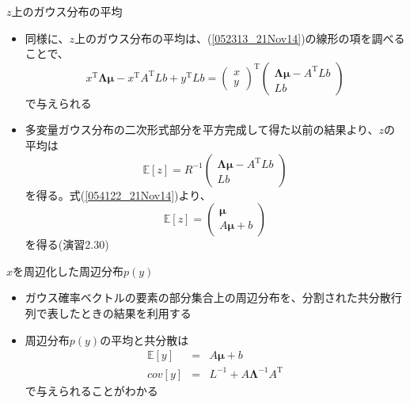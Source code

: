 \begin{frame}{$z$上のガウス分布の平均}
 \begin{itemize}
  \item 同様に、$z$上のガウス分布の平均は、(\ref{052313_21Nov14})の線形の項を調べることで、
        \begin{equation}
         x^{\mathrm{T}}\bm{\Lambda}\bm{\mu}-x^{\mathrm{T}}A^{\mathrm{T}}Lb+y^{\mathrm{T}}Lb =
          \begin{pmatrix}
           x \\
           y
          \end{pmatrix}^{\mathrm{T}}
          \begin{pmatrix}
           \bm{\Lambda}\bm{\mu}-A^{\mathrm{T}}Lb \\
           Lb
          \end{pmatrix}
        \end{equation}
        で与えられる
  \item 多変量ガウス分布の二次形式部分を平方完成して得た以前の結果より、$z$の平均は
        \begin{equation}
         \mathbb{E}[z]=R^{-1}
          \begin{pmatrix}
           \bm{\Lambda}\bm{\mu}-A^{\mathrm{T}}Lb \\
           Lb
          \end{pmatrix}
        \end{equation}
        を得る。式(\ref{054122_21Nov14})より、
        \begin{equation}
         \mathbb{E}[z]=
          \begin{pmatrix}
           \bm{\mu} \\
           A\bm{\mu} + b
          \end{pmatrix}
        \end{equation}
        を得る(演習2.30)
 \end{itemize}
\end{frame}

\begin{frame}{$x$を周辺化した周辺分布$p(y)$}
 \begin{itemize}
  \item ガウス確率ベクトルの要素の部分集合上の周辺分布を、分割された共分散行列で表したときの結果を利用する
  \item 周辺分布$p(y)$の平均と共分散は
        \begin{eqnarray}
         \mathbb{E}[y] &= &A\bm{\mu} +b\\
         cov[y] &=& L^{-1} + A\bm{\Lambda}^{-1}A^{\mathrm{T}}
        \end{eqnarray}
        で与えられることがわかる
 \end{itemize}
\end{frame}


